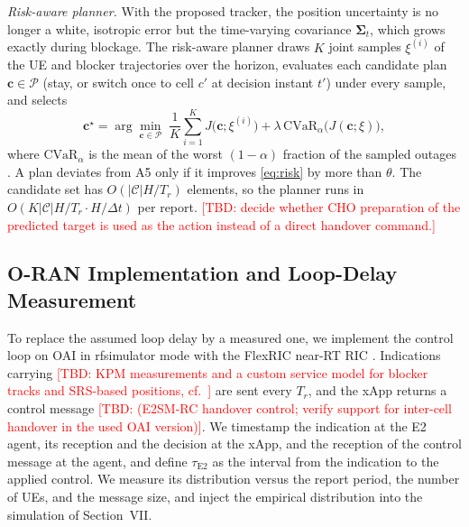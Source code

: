 \documentclass[journal]{IEEEtran}
\newcommand{\tbd}[1]{\textcolor{red}{[TBD: #1]}}
\newenvironment{proposed}{\color{propcol}}{}
\begin{document}
\begin{proposed}
\textit{Risk-aware planner.} With the proposed tracker, the position
uncertainty is no longer a white, isotropic error but the time-varying
covariance $\mathbf\Sigma_t$, which grows exactly during blockage. The
risk-aware planner draws $K$ joint samples $\xi^{(i)}$ of the UE and
blocker trajectories over the horizon, evaluates each candidate plan
$\mathbf c\in\mathcal P$ (stay, or switch once to cell $c'$ at decision
instant $t'$) under every sample, and selects
\begin{equation}
\mathbf c^\star=\arg\min_{\mathbf c\in\mathcal P}\;
\frac1K\sum_{i=1}^K J\bigl(\mathbf c;\xi^{(i)}\bigr)
+\lambda\,\mathrm{CVaR}_\alpha\bigl(J(\mathbf c;\xi)\bigr),
\label{eq:risk}
\end{equation}
where $\mathrm{CVaR}_\alpha$ is the mean of the worst $(1-\alpha)$
fraction of the sampled outages \cite{rockafellar2000cvar}. A plan
deviates from A5 only if it improves \eqref{eq:risk} by more than
$\theta$. The candidate set has $O(|\mathcal C|H/T_r)$ elements, so the
planner runs in $O(K|\mathcal C|H/T_r\cdot H/\Delta t)$ per report.
\tbd{decide whether CHO preparation of the predicted target is used as
the action instead of a direct handover command.}
\end{proposed}

\begin{proposed}
\subsection{O-RAN Implementation and Loop-Delay Measurement}
To replace the assumed loop delay by a measured one, we implement the
control loop on OAI \cite{nikaein2014oai} in rfsimulator mode with the
FlexRIC near-RT RIC \cite{schmidt2021flexric}. Indications carrying
\tbd{KPM measurements and a custom service model for blocker tracks and
SRS-based positions, cf.\ \cite{oran2025locframework}} are sent every
$T_r$, and the xApp returns a control message \tbd{(E2SM-RC handover
control; verify support for inter-cell handover in the used OAI
version)}. We timestamp the indication at the E2 agent, its reception
and the decision at the xApp, and the reception of the control message
at the agent, and define $\tau_{\mathrm{E2}}$ as the interval from the
indication to the applied control. We measure its distribution versus
the report period, the number of UEs, and the message size, and inject
the empirical distribution into the simulation of Section~VII.
\end{proposed}
\end{document}
